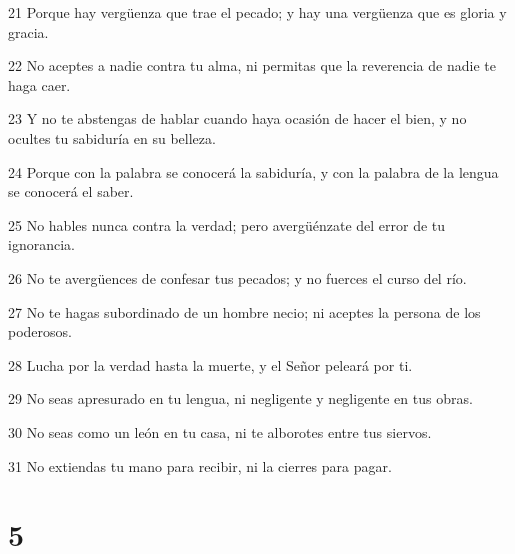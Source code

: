 \par 21 Porque hay vergüenza que trae el pecado; y hay una vergüenza que es gloria y gracia.
\par 22 No aceptes a nadie contra tu alma, ni permitas que la reverencia de nadie te haga caer.
\par 23 Y no te abstengas de hablar cuando haya ocasión de hacer el bien, y no ocultes tu sabiduría en su belleza.
\par 24 Porque con la palabra se conocerá la sabiduría, y con la palabra de la lengua se conocerá el saber.
\par 25 No hables nunca contra la verdad; pero avergüénzate del error de tu ignorancia.
\par 26 No te avergüences de confesar tus pecados; y no fuerces el curso del río.
\par 27 No te hagas subordinado de un hombre necio; ni aceptes la persona de los poderosos.
\par 28 Lucha por la verdad hasta la muerte, y el Señor peleará por ti.
\par 29 No seas apresurado en tu lengua, ni negligente y negligente en tus obras.
\par 30 No seas como un león en tu casa, ni te alborotes entre tus siervos.
\par 31 No extiendas tu mano para recibir, ni la cierres para pagar.

\chapter{5}

